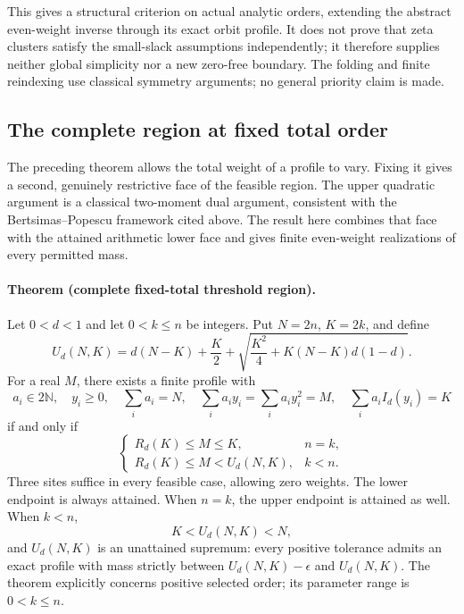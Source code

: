 This gives a structural criterion on actual analytic orders, extending the
abstract even-weight inverse through its exact orbit profile.  It does not
prove that zeta clusters satisfy the small-slack assumptions independently;
it therefore supplies neither global simplicity nor a new zero-free
boundary.  The folding and finite reindexing use classical symmetry
arguments; no general priority claim is made.

\subsection{The complete region at fixed total order}

The preceding theorem allows the total weight of a profile to vary.  Fixing
it gives a second, genuinely restrictive face of the feasible region.
The upper quadratic argument is a classical two-moment dual argument,
consistent with the Bertsimas--Popescu framework cited above.  The result
here combines that face with the attained arithmetic lower face and gives
finite even-weight realizations of every permitted mass.

\paragraph{Theorem (complete fixed-total threshold region).}
Let \(0<d<1\) and let \(0<k\le n\) be integers.  Put \(N=2n\),
\(K=2k\), and define
\begin{equation}
 U_d(N,K)=d(N-K)+\frac K2+
   \sqrt{\frac{K^2}4+K(N-K)d(1-d)}.
 \label{eq:threshold-total-upper}
\end{equation}
For a real \(M\), there exists a finite profile with
\[
 a_i\in2\mathbb N,\quad y_i\ge0,\quad
 \sum_i a_i=N,\quad
 \sum_i a_i y_i=\sum_i a_i y_i^2=M,\quad
 \sum_i a_i I_d(y_i)=K
\]
if and only if
\begin{equation}
 \begin{cases}
 R_d(K)\le M\le K,&n=k,\\
 R_d(K)\le M<U_d(N,K),&k<n.
 \end{cases}
 \label{eq:threshold-total-complete-region}
\end{equation}
Three sites suffice in every feasible case, allowing zero weights.
The lower endpoint is always attained.  When \(n=k\), the upper endpoint
is attained as well.  When \(k<n\),
\[
 K<U_d(N,K)<N,
\]
and \(U_d(N,K)\) is an unattained supremum: every positive tolerance
admits an exact profile with mass strictly between
\(U_d(N,K)-\epsilon\) and \(U_d(N,K)\).
The theorem explicitly concerns positive selected order; its parameter
range is \(0<k\le n\).

